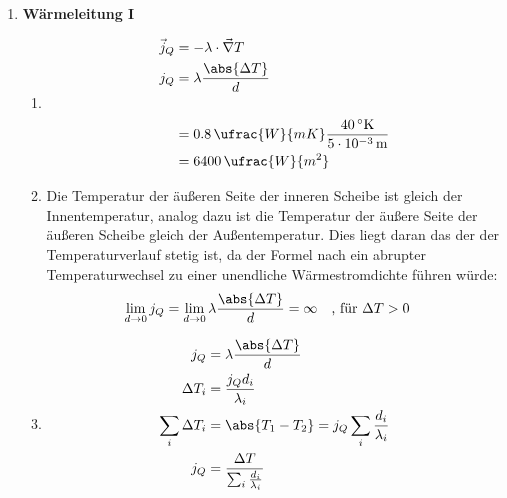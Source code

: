 \documentclass[11pt,letterpaper]{article}
\begin{document}
\begin{enumerate}
  \item \textbf{Wärmeleitung I}
    \begin{enumerate}
      \item
        \begin{align*}
          \vec{j}_Q &= -\lambda\cdot \vec{\nabla}T\\
          j_Q&= \lambda \frac{\abs{\Delta T}}{d}\\
          \\
          &= 0.8\,\ufrac{W}{mK} \frac{40\,^\circ\mathrm{K}}{5\cdot 10^{-3}\, \mathrm{m}}\\
          &= 6400\,\ufrac{W}{m^2}
        \end{align*}

      \item
        Die Temperatur der äußeren Seite der inneren Scheibe ist gleich der Innentemperatur,
        analog dazu ist die Temperatur der äußere Seite der äußeren Scheibe gleich der Außentemperatur.
        Dies liegt daran das der der Temperaturverlauf stetig ist, da der Formel nach ein 
        abrupter Temperaturwechsel zu einer unendliche Wärmestromdichte führen würde:
        \begin{align*}
          \lim_{d\to 0}j_Q &= \lim_{d\to 0}\lambda \frac{\abs{\Delta T}}{d} = \infty \quad \text{, für } \Delta T >0
        \end{align*}

      \item
        \begin{align*}
          j_Q&= \lambda \frac{\abs{\Delta T}}{d}\\
          \Delta T_{i} &= \frac{j_Q d_i}{\lambda_i}\\
          \sum_{i} \Delta T_{i} &= \abs{T_1 - T_2} = j_Q \sum_i \frac{ d_i}{\lambda_i}\\
          j_Q &= \frac{\Delta T}{ \sum_i \frac{ d_i}{\lambda_i}}\\
          \\
        \end{align*}
    \end{enumerate}


\end{enumerate}
\end{document}
